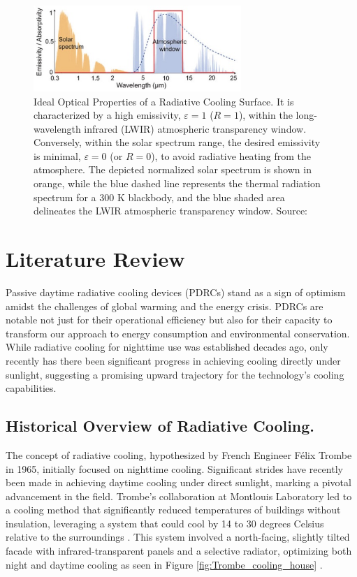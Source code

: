 \begin{figure}[H]
  \centering
  \includegraphics[width=0.7\textwidth]{Chapters/Figures/Chapter 1 Figures/Ideal Optical Properties of a Radiative Cooling Surface.jpg}
  \caption[Ideal Optical Properties of a Radiative Cooling Surface]{Ideal Optical Properties of a Radiative Cooling Surface. It is characterized by a high emissivity, $\varepsilon=1$ ($R=1$), within the long-wavelength infrared (LWIR) atmospheric transparency window. Conversely, within the solar spectrum range, the desired emissivity is minimal, $\varepsilon=0$ (or $R=0$), to avoid radiative heating from the atmosphere. The depicted normalized solar spectrum is shown in orange, while the blue dashed line represents the thermal radiation spectrum for a 300 K blackbody, and the blue shaded area delineates the LWIR atmospheric transparency window. Source: \cite{yang_passive_2020}}
  \label{fig:ideal_PDRC_properties}
\end{figure}


\section{Literature Review}
Passive daytime radiative cooling devices (PDRCs) stand as a sign of optimism amidst the challenges of global warming and the energy crisis. PDRCs are notable not just for their operational efficiency but also for their capacity to transform our approach to energy consumption and environmental conservation. While radiative cooling for nighttime use was established decades ago, only recently has there been significant progress in achieving cooling directly under sunlight, suggesting a promising upward trajectory for the technology's cooling capabilities.

\subsection{Historical Overview of Radiative Cooling.}
The concept of radiative cooling, hypothesized by French Engineer Félix Trombe in 1965, initially focused on nighttime cooling. Significant strides have recently been made in achieving daytime cooling under direct sunlight, marking a pivotal advancement in the field. Trombe's collaboration at Montlouis Laboratory led to a cooling method that significantly reduced temperatures of buildings without insulation, leveraging a system that could cool by 14 to 30 degrees Celsius relative to the surroundings \cite{trombe_aspects_1965}. This system involved a north-facing, slightly tilted facade with infrared-transparent panels and a selective radiator, optimizing both night and daytime cooling as seen in Figure \ref{fig:Trombe_cooling_house} \cite{fortin_passive_2023}.

